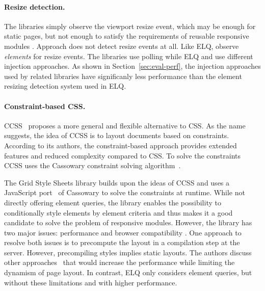 \documentclass[]{llncs}
\newcommand{\elq}{ELQ}
\begin{document}
  \paragraph{Resize detection.}
  The libraries \cite{eq_imp_eqcss,eq_imp_breakpointsjs,eq_imp_mediaclass,eq_imp_elementquery,eq_imp_responsive-elements,eq_imp_sickles,eq_imp_responsive-elements-2,eq_imp_breaks2000,eq_imp_eqjs} simply observe the viewport resize event, which may be enough for static pages, but not enough to satisfy the requirements of reusable responsive modules \cite{elq-thesis}.
  Approach \cite{eq_imp_classquery} does not detect resize events at all.
  Like \elq{}, \cite{eq_imp_localised-css,eq_imp_selector_queries,eq_imp_prollyfill-min-width,eq_imp_gss,eq_imp_element-queries,eq_imp_css-element-queries} observe \emph{elements} for resize events.
  The libraries \cite{eq_imp_localised-css,eq_imp_selector_queries} use polling while \elq{} and \cite{eq_imp_prollyfill-min-width,eq_imp_gss,eq_imp_element-queries,eq_imp_css-element-queries} use different injection approaches.
  As shown in Section~\ref{sec:eval-perf}, the injection approaches used by related libraries have significanly less performance than the element resizing detection system used in \elq{}.

  \paragraph{Constraint-based CSS.}
  CCSS~\cite{badros1999constraint} proposes a more general and flexible alternative to CSS.
  As the name suggests, the idea of CCSS is to layout documents based on constraints.
  According to its authors, the constraint-based approach provides extended features and reduced complexity compared to CSS.
  To solve the constraints CCSS uses the Cassowary constraint solving algorithm~\cite{BadrosBS01}.

  The Grid Style Sheets library \cite{eq_imp_gss} builds upon the ideas of CCSS and uses a JavaScript port~\cite{cassowary_js} of Cassowary to solve the constraints at runtime.
  While not directly offering element queries, the library enables the possibility to conditionally style elements by element criteria and thus makes it a good candidate to solve the problem of responsive modules.
  However, the library has two major issues: performance and browser compatibility \cite{gss_issue}.
  One approach to resolve both issues is to precompute the layout in a compilation step at the server.
  However, precompiling styles implies static layouts.
  The authors discuss other approaches~\cite{gss_issue} that would increase the performance while limiting the dynamism of page layout.
  In contrast, \elq{} only considers element queries, but without these limitations and with higher performance.
\end{document}
